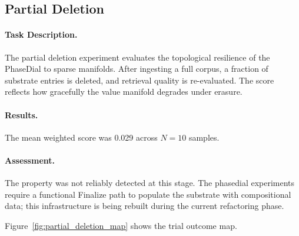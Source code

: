 \subsection{Partial Deletion}
\label{sec:partial_deletion}

\paragraph{Task Description.}
The partial deletion experiment evaluates the topological resilience of the PhaseDial to sparse
manifolds.  After ingesting a full corpus, a fraction of substrate
entries is deleted, and retrieval quality is re-evaluated.  The score
reflects how gracefully the value manifold degrades under erasure.

\paragraph{Results.}
The mean weighted score was 0.029 across $N = 10$ samples.

\paragraph{Assessment.}
The property was not reliably detected at this stage.  The phasedial
experiments require a functional Finalize path to populate the substrate
with compositional data; this infrastructure is being rebuilt during
the current refactoring phase.

Figure~\ref{fig:partial_deletion_map} shows the trial outcome map.
